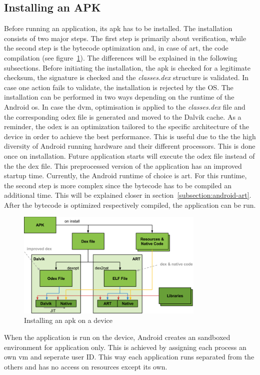 \subsection{Installing an APK} \label{subsection:android-install}
Before running an application, its \gls{apk} has to be installed.
The installation consists of two major steps.
The first step is primarily about verification, while the second step is the bytecode optimization and, in case of \gls{art}, the code compilation (see figure~\ref{fig:install}).
The differences will be explained in the following subsections.
\newline
Before initiating the installation, the \gls{apk} is checked for a legitimate checksum, the signature is checked and the \textit{classes.dex} structure is validated.
In case one action fails to validate, the installation is rejected by the OS.
\newline
The installation can be performed in two ways depending on the runtime of the Android \gls{os}.
In case the \gls{dvm}, optimisation is applied to the \textit{classes.dex} file and the corresponding \gls{odex} file is generated and moved to the Dalvik cache.
As a reminder, the \gls{odex} is an optimization tailored to the specific architecture of the device in order to achieve the best performance.
This is useful due to the the high diversity of Android running hardware and their different processors.
This is done once on installation.
Future application starts will execute the \gls{odex} file instead of the the \gls{dex} file.
This preprocessed version of the application has an improved startup time. \cite{kovachevaMaster}
\newline
Currently, the Android runtime of choice is \gls{art}.
For this runtime, the second step is more complex since the bytecode has to be compiled an additional time.
This will be explained closer in section~\ref{subsection:android-art}.
\newline
After the bytecode is optimized respectively compiled, the application can be run.
\newline
\begin{figure}[h]
    \centering
    \includegraphics[width=0.8\textwidth]{data/install.png}
    \caption{Installing an \gls{apk} on a device \cite{googleIOArt}}
    \label{fig:install}
\end{figure}
When the application is run on the device, Android creates an sandboxed environment for application only.
This is achieved by assigning each process an own \gls{vm} and seperate user ID.
This way each application runs separated from the others and has no access on resources except its own. \cite{developerFundamentals}
